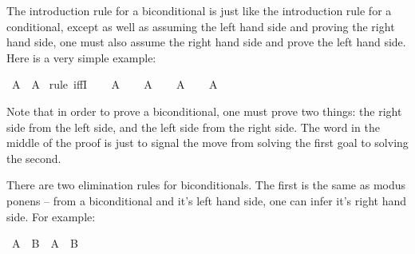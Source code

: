 \begin{isabellebody}
%
\isamarkuptrue%
%
\begin{isamarkuptext}%
The introduction rule for a biconditional is just like the introduction rule for a
conditional, except as well as assuming the left hand side and proving the right hand side, one
must also assume the right hand side and prove the left hand side. Here is a very simple example:%
\end{isamarkuptext}\isamarkuptrue%
\isamarkupfalse%
\ {\isachardoublequoteopen}A\ {\isasymlongleftrightarrow}\ A{\isachardoublequoteclose}\isanewline
%
\isadelimproof
%
\endisadelimproof
%
\isatagproof
{}\isamarkupfalse%
\ {\isacharparenleft}rule\ iffI{\isacharparenright}\isanewline
\ \ \isamarkupfalse%
\ {\isachardoublequoteopen}A{\isachardoublequoteclose}\isanewline
\ \ \isamarkupfalse%
\ {\isachardoublequoteopen}A{\isachardoublequoteclose}\isacommand{{\isachardot}}\isamarkupfalse%
\isanewline
{}\isamarkupfalse%
\isanewline
\ \ \isamarkupfalse%
\ {\isachardoublequoteopen}A{\isachardoublequoteclose}\isanewline
\ \ \isamarkupfalse%
\ {\isachardoublequoteopen}A{\isachardoublequoteclose}\isacommand{{\isachardot}}\isamarkupfalse%
\isanewline
{}\isamarkupfalse%
%
\endisatagproof
{\isafoldproof}%
%
\isadelimproof
%
\endisadelimproof
%
\begin{isamarkuptext}%
Note that in order to prove a biconditional, one must prove two things: the right side from 
the left side, and the left side from the right side. The word  in the middle of the
proof is just to signal the move from solving the first goal to solving the second.%
\end{isamarkuptext}\isamarkuptrue%
%
\isamarkuptrue%
%
\begin{isamarkuptext}%
There are two elimination rules for biconditionals. The first is the same as modus ponens --
from a biconditional and it's left hand side, one can infer it's right hand side. For example:%
\end{isamarkuptext}\isamarkuptrue%
\isamarkupfalse%
\ {\isachardoublequoteopen}{\isacharparenleft}A\ {\isasymlongleftrightarrow}\ B{\isacharparenright}\ {\isasymlongrightarrow}\ A\ {\isasymlongrightarrow}\ B{\isachardoublequoteclose}\isanewline
%
\isadelimproof
%
\endisadelimproof
%
\isatagproof
{}\isamarkupfalse%
\isanewline
\ \ \isamarkupfalse%

\end{isabellebody}
